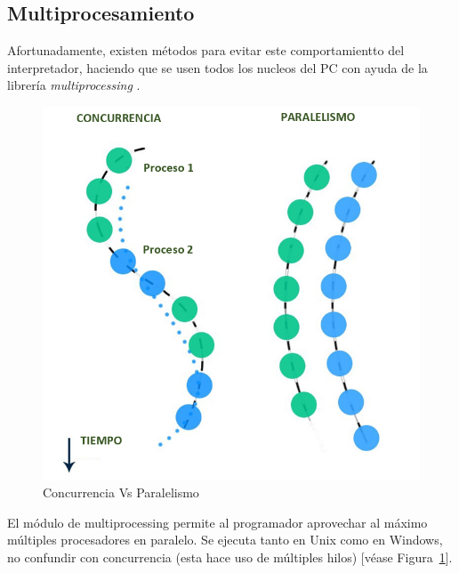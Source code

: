 \subsection{Multiprocesamiento}
Afortunadamente, existen métodos para evitar este comportamientto del interpretador, haciendo que se usen todos los nucleos del PC con ayuda de la librería \textit{multiprocessing} \parencite{Multiprocessing}.\newline
\begin{figure}[th]
    \centering
    \includegraphics[scale=.35]{Figures/Multiprocesamiento}
    \decoRule
    \caption[Concurrencia Vs Paralelismo]{Concurrencia  Vs Paralelismo}
    \label{fig:multiprocessing}
\end{figure}

El módulo de multiprocessing permite al programador aprovechar al máximo múltiples procesadores en paralelo. Se ejecuta tanto en Unix como en Windows, no confundir con concurrencia (esta hace uso de múltiples hilos) [véase Figura~\ref{fig:multiprocessing}].
\hfill 

\break







